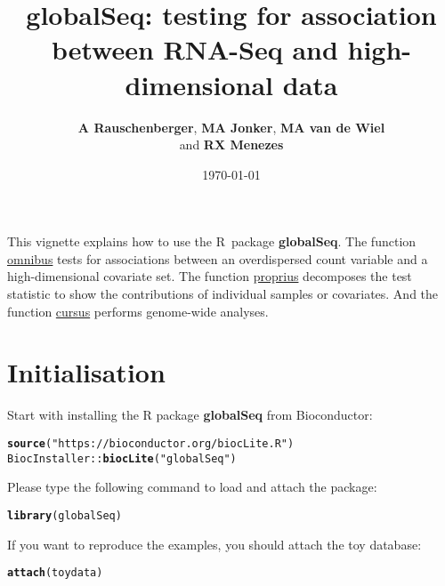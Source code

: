 \documentclass{article}\usepackage[]{graphicx}\usepackage[]{color}
\title{globalSeq: testing for association between \mbox{RNA-Seq} and high-dimensional data}
\date{\today}
\author{\textbf{A Rauschenberger}, \textbf{MA Jonker}, \textbf{MA van de Wiel} \\ and \textbf{RX Menezes}}
\makeatletter
\newcommand{\hlstr}[1]{\textcolor[rgb]{0.192,0.494,0.8}{#1}}%
\newcommand{\hlopt}[1]{\textcolor[rgb]{0,0,0}{#1}}%
\newcommand{\hlstd}[1]{\textcolor[rgb]{0.345,0.345,0.345}{#1}}%
\newcommand{\hlkwd}[1]{\textcolor[rgb]{0.737,0.353,0.396}{\textbf{#1}}}%
\newenvironment{kframe}{%
 \def\at@end@of@kframe{}%
 \ifinner\ifhmode%
  \def\at@end@of@kframe{\end{minipage}}%
  \begin{minipage}{\columnwidth}%
 \fi\fi%
 \def\FrameCommand##1{\hskip\@totalleftmargin \hskip-\fboxsep
 \colorbox{shadecolor}{##1}\hskip-\fboxsep
     \hskip-\linewidth \hskip-\@totalleftmargin \hskip\columnwidth}%
 \MakeFramed {\advance\hsize-\width
   \@totalleftmargin\z@ \linewidth\hsize
   \@setminipage}}%
 {\par\unskip\endMakeFramed%
 \at@end@of@kframe}
\newenvironment{knitrout}{}{} %
\makeatother
\begin{document}
\maketitle

This vignette explains how to use the R~package \textbf{globalSeq}. The function \hyperref[TOA]{\mbox{omnibus}} tests  for associations between an overdispersed count variable and a high-dimensional covariate set. The function \hyperref[DCN]{\mbox{proprius}} decomposes the test statistic to show the contributions of individual samples or covariates. And the function \hyperref[GWA]{\mbox{cursus}} performs genome-wide analyses.

\section{Initialisation}
\label{Initialisation}

Start with installing the R package \textbf{globalSeq} from Bioconductor:
\begin{knitrout}
\color{fgcolor}\begin{kframe}
\begin{alltt}
\hlkwd{source}\hlstd{(}\hlstr{"https://bioconductor.org/biocLite.R"}\hlstd{)}
\hlstd{BiocInstaller}\hlopt{::}\hlkwd{biocLite}\hlstd{(}\hlstr{"globalSeq"}\hlstd{)}
\end{alltt}
\end{kframe}
\end{knitrout}

Please type the following command to load and attach the package:
\begin{knitrout}
\color{fgcolor}\begin{kframe}
\begin{alltt}
\hlkwd{library}\hlstd{(globalSeq)}
\end{alltt}
\end{kframe}
\end{knitrout}

If you want to reproduce the examples, you should attach the toy database:
\begin{knitrout}
\color{fgcolor}\begin{kframe}
\begin{alltt}
\hlkwd{attach}\hlstd{(toydata)}
\end{alltt}
\end{kframe}
\end{knitrout}
\end{document}
